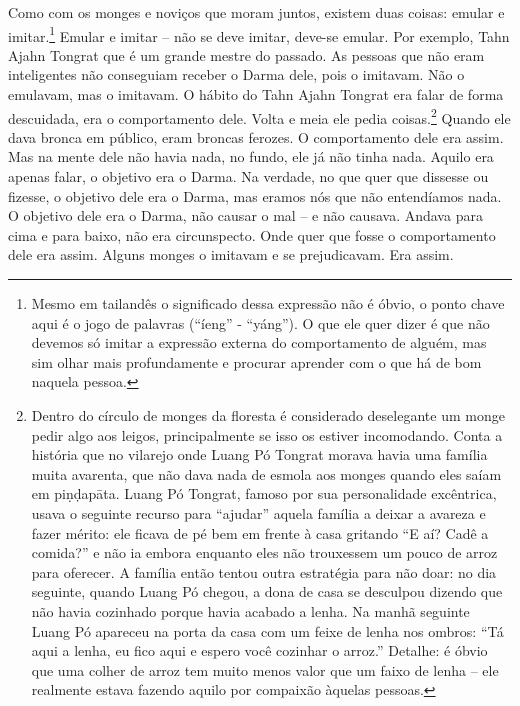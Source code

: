 Como com os monges e noviços que moram juntos, existem duas coisas:
emular e imitar.\footnote{Mesmo em tailandês o significado dessa
expressão não é óbvio, o ponto chave aqui é o jogo de palavras
(“íeng” - “yáng”). O que ele quer dizer é que não devemos só imitar a
expressão externa do comportamento de alguém, mas sim olhar mais
profundamente e procurar aprender com o que há de bom naquela pessoa.}
Emular e imitar – não se deve imitar, deve-se emular. Por exemplo, Tahn
Ajahn Tongrat que é um grande mestre do passado. As pessoas que não
eram inteligentes não conseguiam receber o Darma dele, pois o imitavam.
Não o emulavam, mas o imitavam. O hábito do Tahn Ajahn Tongrat era
falar de forma descuidada, era o comportamento dele. Volta e meia ele
pedia coisas.\footnote{Dentro do círculo de monges da floresta é
considerado deselegante um monge pedir algo aos leigos, principalmente
se isso os estiver incomodando. Conta a história que no vilarejo onde
Luang Pó Tongrat morava havia uma família muita avarenta, que não dava
nada de esmola aos monges quando eles saíam em piṇḍapāta. Luang Pó
Tongrat, famoso por sua personalidade excêntrica, usava o seguinte
recurso para “ajudar” aquela família a deixar a avareza e fazer mérito:
ele ficava de pé bem em frente à casa gritando “E aí? Cadê a comida?” e
não ia embora enquanto eles não trouxessem um pouco de arroz para
oferecer. A família então tentou outra estratégia para não doar: no dia
seguinte, quando Luang Pó chegou, a dona de casa se desculpou dizendo
que não havia cozinhado porque havia acabado a lenha. Na manhã seguinte
Luang Pó apareceu na porta da casa com um feixe de lenha nos ombros:
“Tá aqui a lenha, eu fico aqui e espero você cozinhar o arroz.”
Detalhe: é óbvio que uma colher de arroz tem muito menos valor que um
faixo de lenha – ele realmente estava fazendo aquilo por compaixão
àquelas pessoas.} Quando ele dava bronca em público, eram broncas
ferozes. O comportamento dele era assim. Mas na mente dele não havia
nada, no fundo, ele já não tinha nada. Aquilo era apenas falar, o
objetivo era o Darma. Na verdade, no que quer que dissesse ou fizesse,
o objetivo dele era o Darma, mas eramos nós que não entendíamos nada. O
objetivo dele era o Darma, não causar o mal – e não causava. Andava
para cima e para baixo, não era circunspecto. Onde quer que fosse o
comportamento dele era assim. Alguns monges o imitavam e se
prejudicavam. Era assim.

